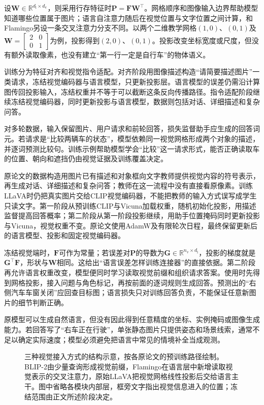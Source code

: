 设$\bm W\in\mathbb R^{d_{\mathrm l}\times d_{\mathrm v}}$，则采用行存特征时$\bm P=\bm F\bm W^\top$。网格顺序和图像输入边界帮助模型知道哪些位置属于图片；语言自注意力随后在视觉位置与文字位置之间计算，和Flamingo另设一条交叉注意力分支不同。以两个二维教学网格$(1,0)$、$(0,1)$及$\bm W=\left[\begin{smallmatrix}2&0\\0&1\end{smallmatrix}\right]$为例，投影得到$(2,0)$、$(0,1)$。投影改变坐标宽度或尺度，但没有额外读取像素，也没有建立“第一行一定是自行车”的物体语义。

训练分为特征对齐和视觉指令适配。对齐阶段用图像描述构造“请简要描述图片”一类请求，冻结视觉编码器与语言模型，只更新投影层。语言模型的误差仍需沿计算图传回投影输入，冻结权重并不等于可以截断这条反向传播路径。指令适配阶段继续冻结视觉编码器，同时更新投影与语言模型，数据则包括对话、详细描述和复杂问答。

对多轮数据，输入保留图片、用户请求和前轮回答，损失监督助手应生成的回答词元。若请求是“比较两辆车的状态”，模型依赖同一视觉网格形成两个对象的描述，并逐词预测比较句。训练示例帮助模型学会“比较”这一请求形式，能否正确读取车的位置、朝向和遮挡仍由视觉证据及训练覆盖决定。

原论文的数据构造用图片已有描述和对象框向文字教师提供视觉内容的符号表示，再生成对话、详细描述和复杂问答；教师在这一流程中没有直接看原像素。训练LLaVA时仍把真实图片交给CLIP视觉编码器，不能把教师的输入方式误写成学生只读文字。第一阶段从预训练CLIP与Vicuna加载权重，随机初始化投影，用描述监督提高回答概率；第二阶段从第一阶段投影继续，用助手位置掩码同时更新投影与Vicuna，视觉权重不变。原论文使用AdamW及有限轮次日程，最终保留更新后的语言模型、投影和固定视觉编码器。

冻结视觉端时，$\bm F$可作为常量；若误差对$\bm P$的导数为$\bm G\in\mathbb R^{n_{\mathrm v}\times d_{\mathrm l}}$，投影的梯度就是$\bm G^\top\bm F$，形状与$\bm W$相同。这给出“语言误差怎样训练连接器”的直接依据。第二阶段再允许语言权重改变，模型便同时学习读取视觉前缀和组织请求答案。使用时先得到网格投影，接入问题与角色标记，再按前面的逐词规则生成回答。预测出的“右侧汽车车窗关闭”应回查目标图；语言损失只对训练回答负责，不能保证任意新图片的细节判断正确。

原模型可以生成自然语言，但没有因此得到任意精度的坐标、实例掩码或图像生成能力。若回答写了“右车正在行驶”，单张静态图片只提供姿态和场景线索，通常不足以确定实际速度；模型必须避免把语言中常见的情境补全当成观测。

\begin{figure}[htbp]
  \centering
  
  \caption{三种视觉接入方式的结构示意，按各原论文的预训练路径绘制。BLIP-2由少量查询形成视觉前缀，Flamingo在语言层中新增读取视觉表示的交叉注意力，原始LLaVA把视觉网格线性投影后交给语言主干。图中省略各模块内部层，框旁文字指出视觉信息进入的位置；冻结范围由正文所述阶段决定。}
  \label{fig:vision-language-connectors}
\end{figure}
\FloatBarrier

